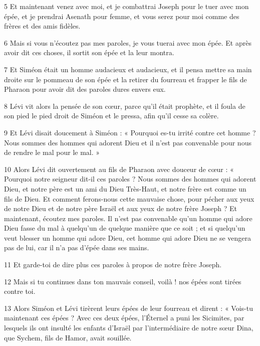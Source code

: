 \par 5 Et maintenant venez avec moi, et je combattrai Joseph pour le tuer avec mon épée, et je prendrai Asenath pour femme, et vous serez pour moi comme des frères et des amis fidèles.

\par 6 Mais si vous n’écoutez pas mes paroles, je vous tuerai avec mon épée. Et après avoir dit ces choses, il sortit son épée et la leur montra.

\par 7 Et Siméon était un homme audacieux et audacieux, et il pensa mettre sa main droite sur le pommeau de son épée et la retirer du fourreau et frapper le fils de Pharaon pour avoir dit des paroles dures envers eux.

\par 8 Lévi vit alors la pensée de son cœur, parce qu'il était prophète, et il foula de son pied le pied droit de Siméon et le pressa, afin qu'il cesse sa colère.

\par 9 Et Lévi disait doucement à Siméon : « Pourquoi es-tu irrité contre cet homme ? Nous sommes des hommes qui adorent Dieu et il n’est pas convenable pour nous de rendre le mal pour le mal. »

\par 10 Alors Lévi dit ouvertement au fils de Pharaon avec douceur de cœur : « Pourquoi notre seigneur dit-il ces paroles ? Nous sommes des hommes qui adorent Dieu, et notre père est un ami du Dieu Très-Haut, et notre frère est comme un fils de Dieu. Et comment ferons-nous cette mauvaise chose, pour pécher aux yeux de notre Dieu et de notre père Israël et aux yeux de notre frère Joseph ? Et maintenant, écoutez mes paroles. Il n'est pas convenable qu'un homme qui adore Dieu fasse du mal à quelqu'un de quelque manière que ce soit ; et si quelqu'un veut blesser un homme qui adore Dieu, cet homme qui adore Dieu ne se vengera pas de lui, car il n'a pas d'épée dans ses mains.

\par 11 Et garde-toi de dire plus ces paroles à propos de notre frère Joseph.

\par 12 Mais si tu continues dans ton mauvais conseil, voilà ! nos épées sont tirées contre toi.

\par 13 Alors Siméon et Lévi tirèrent leurs épées de leur fourreau et dirent : « Vois-tu maintenant ces épées ? Avec ces deux épées, l'Éternel a puni les Sicimites, par lesquels ils ont insulté les enfants d'Israël par l'intermédiaire de notre sœur Dina, que Sychem, fils de Hamor, avait souillée.

